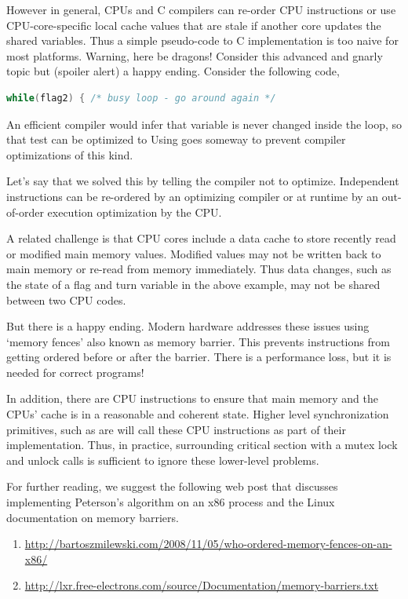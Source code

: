 However in general, CPUs and C compilers can re-order CPU instructions or use CPU-core-specific local cache values that are stale if another core updates the shared variables.
Thus a simple pseudo-code to C implementation is too naive for most platforms.
Warning, here be dragons!
Consider this advanced and gnarly topic but (spoiler alert) a happy ending.
Consider the following code,

\begin{lstlisting}[language=C]
while(flag2) { /* busy loop - go around again */
\end{lstlisting}

An efficient compiler would infer that  variable is never changed inside the loop, so that test can be optimized to  Using  goes someway to prevent compiler optimizations of this kind.

Let's say that we solved this by telling the compiler not to optimize.
Independent instructions can be re-ordered by an optimizing compiler or at runtime by an out-of-order execution optimization by the CPU.

A related challenge is that CPU cores include a data cache to store recently read or modified main memory values.
Modified values may not be written back to main memory or re-read from memory immediately.
Thus data changes, such as the state of a flag and turn variable in the above example, may not be shared between two CPU codes.

But there is a happy ending.
Modern hardware addresses these issues using `memory fences' also known as memory barrier.
This prevents instructions from getting ordered before or after the barrier.
There is a performance loss, but it is needed for correct programs!

In addition, there are CPU instructions to ensure that main memory and the CPUs' cache is in a reasonable and coherent state.
Higher level synchronization primitives, such as  are will call these CPU instructions as part of their implementation.
Thus, in practice, surrounding critical section with a mutex lock and unlock calls is sufficient to ignore these lower-level problems.

For further reading, we suggest the following web post that discusses implementing Peterson's algorithm on an x86 process and the Linux documentation on memory barriers.
\begin{enumerate}
\item \href{Memory Fences}{http://bartoszmilewski.com/2008/11/05/who-ordered-memory-fences-on-an-x86/}
\item \href{Memory Barriers}{http://lxr.free-electrons.com/source/Documentation/memory-barriers.txt}
\end{enumerate}

